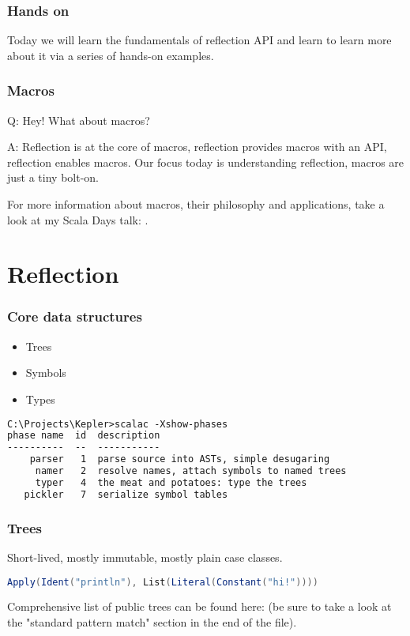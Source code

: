 \documentclass[hyperref={bookmarks=false}]{beamer}
\begin{document}
\begin{frame}[fragile]
\frametitle{Hands on}

Today we will learn the fundamentals of reflection API and learn to learn more about it
via a series of hands-on examples.

\end{frame}

\begin{frame}[fragile]
\frametitle{Macros}

Q: Hey! What about macros?

A: Reflection is at the core of macros, reflection provides macros with an API, reflection enables macros.
Our focus today is understanding reflection, macros are just a tiny bolt-on.

For more information about macros, their philosophy and applications, take a look at my Scala Days talk:
.

\end{frame}

\section{Reflection}

\begin{frame}[fragile]
\frametitle{Core data structures}

\begin{itemize}
\item Trees
\item Symbols
\item Types
\end{itemize}

\begin{lstlisting}[language=XML]
C:\Projects\Kepler>scalac -Xshow-phases
phase name  id  description
----------  --  -----------
    parser   1  parse source into ASTs, simple desugaring
     namer   2  resolve names, attach symbols to named trees
     typer   4  the meat and potatoes: type the trees
   pickler   7  serialize symbol tables
\end{lstlisting}
\end{frame}

\begin{frame}[fragile]
\frametitle{Trees}

Short-lived, mostly immutable, mostly plain case classes.

\begin{lstlisting}[language=Scala]
Apply(Ident("println"), List(Literal(Constant("hi!"))))
\end{lstlisting}

Comprehensive list of public trees can be found here:
(be sure to take a look at the "standard pattern match" section in the end of the file).

\end{frame}
\end{document}
